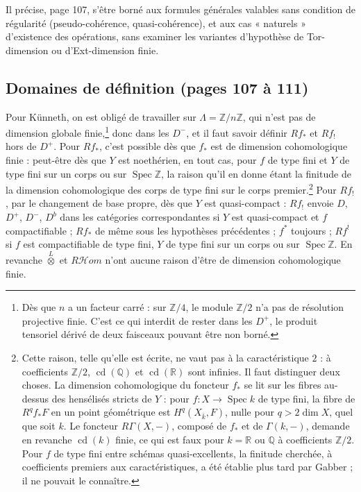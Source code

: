 \documentclass[11pt,a4paper]{article}
\begin{document}
Il précise, page 107, s'être borné aux formules générales valables sans
condition de régularité (pseudo-cohérence, quasi-cohérence), et aux cas
« naturels » d'existence des opérations, sans examiner les variantes
d'hypothèse de Tor-dimension ou d'Ext-dimension finie.

\subsection*{Domaines de définition (pages 107 à 111)}

Pour Künneth, on est obligé de travailler sur $\Lambda = \mathbb{Z}/n\mathbb{Z}$,
qui n'est pas de dimension globale finie,\footnote{Dès que $n$ a un facteur
carré : sur $\mathbb{Z}/4$, le module $\mathbb{Z}/2$ n'a pas de résolution
projective finie. C'est ce qui interdit de rester dans les $D^{+}$, le
produit tensoriel dérivé de deux faisceaux pouvant être non borné.} donc dans
les $D^{-}$, et il faut savoir définir $Rf_{*}$ et $Rf_{!}$ hors de $D^{+}$.
Pour $Rf_{*}$, c'est possible dès que $f_{*}$ est de dimension cohomologique
finie : peut-être dès que $Y$ est noethérien, en tout cas, pour $f$ de type
fini et $Y$ de type fini sur un corps ou sur $\operatorname{Spec}\mathbb{Z}$,
la raison qu'il en donne étant la finitude de la dimension cohomologique des
corps de type fini sur le corps premier.\footnote{Cette raison, telle qu'elle
est écrite, ne vaut pas à la caractéristique $2$ : à coefficients
$\mathbb{Z}/2$, $\operatorname{cd}(\mathbb{Q})$ et
$\operatorname{cd}(\mathbb{R})$ sont infinies. Il faut distinguer deux
choses. La dimension cohomologique du foncteur $f_{*}$ se lit sur les fibres
au-dessus des hensélisés stricts de $Y$ : pour $f : X \to \operatorname{Spec}
k$ de type fini, la fibre de $R^{q}f_{*}F$ en un point géométrique est
$H^{q}(X_{\bar{k}}, F)$, nulle pour $q > 2\dim X$, quel que soit $k$. Le
foncteur $R\Gamma(X, -)$, composé de $f_{*}$ et de $\Gamma(k, -)$, demande en
revanche $\operatorname{cd}(k)$ finie, ce qui est faux pour $k = \mathbb{R}$
ou $\mathbb{Q}$ à coefficients $\mathbb{Z}/2$. Pour $f$ de type fini entre
schémas quasi-excellents, la finitude cherchée, à coefficients premiers aux
caractéristiques, a été établie plus tard par Gabber ; il ne pouvait le
connaître.} Pour $Rf_{!}$, par le changement de base propre, dès que $Y$ est
quasi-compact : $Rf_{!}$ envoie $D$, $D^{+}$, $D^{-}$, $D^{b}$ dans les
catégories correspondantes si $Y$ est quasi-compact et $f$ compactifiable ;
$Rf_{*}$ de même sous les hypothèses précédentes ; $f^{*}$ toujours ; $Rf^{!}$
si $f$ est compactifiable de type fini, $Y$ de type fini sur un corps ou sur
$\operatorname{Spec}\mathbb{Z}$. En revanche $\overset{L}{\otimes}$ et
$R\mathcal{H}om$ n'ont aucune raison d'être de dimension cohomologique finie.
\end{document}
